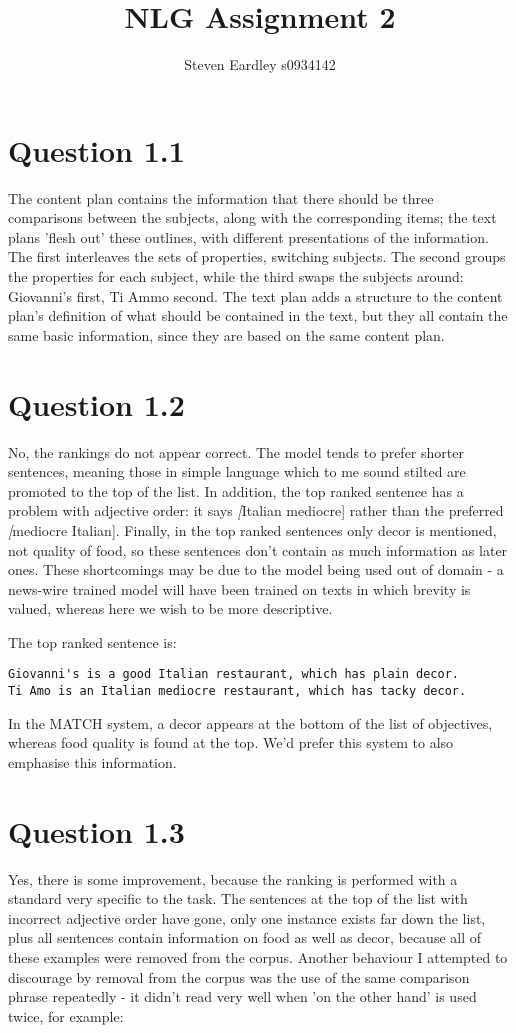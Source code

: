 \documentclass[a4paper,11pt,oneside]{article}
\begin{document}
\title{NLG Assignment 2}
\author{Steven Eardley s0934142}
\maketitle

\section{Question 1.1}
The content plan contains the information that there should be three comparisons between the subjects, along with the corresponding items; the text plans 'flesh out' these outlines, with different presentations of the information. The first interleaves the sets of properties, switching subjects. The second groups the properties for each subject, while the third swaps the subjects around: Giovanni's first, Ti Ammo second. The text plan adds a structure to the content plan's definition of what should be contained in the text, but they all contain the same basic information, since they are based on the same content plan.

\section{Question 1.2}
No, the rankings do not appear correct. The model tends to prefer shorter sentences, meaning those in simple language which to me sound stilted are promoted to the top of the list. In addition, the top ranked sentence has a problem with adjective order: it says \emph[Italian mediocre] rather than the preferred \emph[mediocre Italian]. Finally, in the top ranked sentences only decor is mentioned, not quality of food, so these sentences don't contain as much information as later ones. These shortcomings may be due to the model being used out of domain - a news-wire trained model will have been trained on texts in which brevity is valued, whereas here we wish to be more descriptive.

The top ranked sentence is:
\begin{verbatim}
Giovanni's is a good Italian restaurant, which has plain decor. 
Ti Amo is an Italian mediocre restaurant, which has tacky decor. 
\end{verbatim}

In the MATCH system, a decor appears at the bottom of the list of objectives, whereas food quality is found at the top. We'd prefer this system to also emphasise this information.

\section{Question 1.3}
Yes, there is some improvement, because the ranking is performed with a standard very specific to the task. The sentences at the top of the list with incorrect adjective order have gone, only one instance exists far down the list, plus all sentences contain information on food as well as decor, because all of these examples were removed from the corpus.  Another behaviour I attempted to discourage by removal from the corpus was the use of the same comparison phrase repeatedly - it didn't read very well when 'on the other hand' is used twice, for example:
\end{document}
